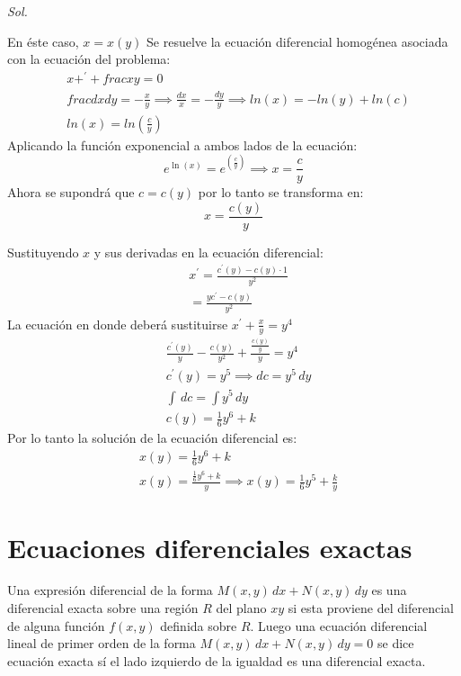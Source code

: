 \textit{ Sol. }

En éste caso, $x=x(y)$ 
Se resuelve la ecuación diferencial homogénea asociada con la ecuación del problema:
\begin{align*}
    &x+^{\prime}+frac{x}{y}=0\\
    &frac{dx}{dy}=-\frac{x}{y}\implies \frac{dx}{x}=-\frac{dy}{y}\implies ln{(x)}=-ln{(y)}+ln{(c)}\\
    &ln{(x)}=ln{\left(\frac{c}{y}\right)}
\end{align*}
Aplicando la función exponencial a ambos lados de la ecuación: 
\begin{equation*}
e^{\ln{(x)}}=e^{\left(\frac{c}{y}\right) }\implies x=\frac{c}{y}
\end{equation*}
Ahora se supondrá que $c=c(y)$ por lo tanto se transforma en: 
\begin{equation*}
    x=\frac{c(y)}{y}
\end{equation*}

Sustituyendo $x$ y sus derivadas en la ecuación diferencial:
\begin{align*}
    &x^{\prime}=\frac{c^{\prime}(y)-c(y)\cdot 1}{y^2}\\
    &=\frac{yc^{\prime}-c(y)}{y^2}
\end{align*}
La ecuación en donde deberá sustituirse $x^{\prime}+\frac{x}{y}=y^4$
\begin{align*}
    &\frac{c^{\prime}(y)}{y}-\frac{c(y)}{y^2}+\frac{\frac{c(y)}{y}}{y}=y^4\\
    &c^{\prime}(y)=y^5\implies dc=y^5\, dy\\
    &\int \,dc=\int y^5\, dy\\
    &c(y)=\frac{1}{6}y^6+k
\end{align*}
Por lo tanto la solución de la ecuación diferencial es:
\begin{align*}
    &x(y)=\frac{1}{6}y^6+k\\
    &x(y)=\frac{\frac{1}{6}y^6+k}{y}\implies x(y)=\frac{1}{6}y^5+\frac{k}{y}
\end{align*}

\section{Ecuaciones diferenciales exactas}


\begin{definition}
    Una expresión diferencial de la forma $M(x,y)\, dx+N(x,y)\, dy$ es una diferencial exacta sobre una región $R$ del plano $xy$ si esta proviene del diferencial de alguna función $f(x,y)$ definida sobre $R$. Luego una ecuación diferencial lineal de primer orden de la forma $M(x,y)\, dx+N(x,y)\, dy=0$ se dice ecuación exacta sí el lado izquierdo de la igualdad es una diferencial exacta.
\end{definition}


